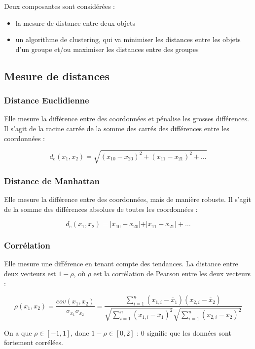 Deux composantes sont considérées :

\begin{itemize}
	\item la mesure de distance entre deux objets
	\item un algorithme de clustering, qui va minimiser les distances entre les objets d'un groupe et/ou maximiser les distances entre des groupes
\end{itemize}

	\subsection{Mesure de distances}
		\subsubsection{Distance Euclidienne}
		Elle mesure la différence entre des coordonnées et pénalise les grosses différences. Il s'agit de la racine carrée de la somme des carrés des différences entre les coordonnées :
		
		$$d_e(x_1, x_2) = \sqrt{(x_{10}-x_{20})^2 + (x_{11}-x_{21})^2 + \dots}$$
		
		\subsubsection{Distance de Manhattan}
		Elle mesure la différence entre des coordonnées, mais de manière robuste. Il s'agit de la somme des différences absolues de toutes les coordonnées :
		
		$$d_e(x_1, x_2) = \vert x_{10}-x_{20} \vert + \vert x_{11}-x_{21} \vert + \dots$$
		
		\subsubsection{Corrélation}
		Elle mesure une différence en tenant compte des tendances. La distance entre deux vecteurs est $1 - \rho$, où $\rho$ est la corrélation de Pearson entre les deux vecteurs :
		
		$$\rho(x_1, x_2) = \frac{cov(x_1, x_2)}{\sigma_{x_1} \sigma_{x_2}} = \frac{\sum_{i = 1}^n (x_{1, i} - \overline{x}_1)(x_{2, i} - \overline{x}_2)}{\sqrt{\sum_{i = 1}^n (x_{1, i} - \overline{x}_1)^2} \sqrt{\sum_{i = 1}^n (x_{2, i} - \overline{x}_2)^2}}$$
	
		On a que $\rho \in [-1, 1]$, donc $1 - \rho \in [0, 2]$ : 0 signifie que les données sont fortement corrélées.
	
